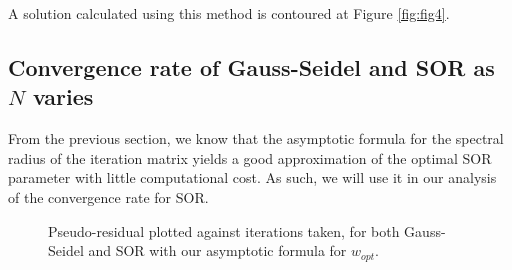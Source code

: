 \documentclass{article}
\numberwithin{equation}{section}
\theoremstyle{definition}
\begin{document}
A solution calculated using this method is contoured at Figure \ref{fig:fig4}.









\subsection{Convergence rate of Gauss-Seidel and SOR as $N$ varies}
From the previous section, we know that the asymptotic formula for the spectral radius of the iteration matrix yields a good approximation of the optimal SOR parameter with little computational cost. As such, we will use it in our analysis of the convergence rate for SOR.
\begin{figure}[H]
    \centering
    \hfill

    \hfill
    \caption{Pseudo-residual plotted against iterations taken, for both Gauss-Seidel and SOR with our asymptotic formula for $w_{opt}$.}
    \label{fig:fig5}
\end{figure}
\end{document}
